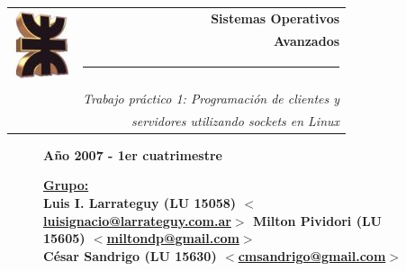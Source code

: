 \thispagestyle{empty}

\begin{center}
\begin{tabular}{cr}
\multirow{4}{*}{ \includegraphics{logoUTN.jpg} }
& \Huge\bfseries Sistemas Operativos \\
& \Huge\bfseries Avanzados \\
& \noindent\rule[-1ex]{120mm}{4pt} \\
& \\
& \noindent\large\emph{Trabajo práctico 1: Programación de clientes y} \\
& \noindent\large\emph{servidores utilizando sockets en Linux}
\end{tabular}
\end{center}


\begin{figure}[b]
\center\large\textbf{Año 2007 - 1er cuatrimestre}
\normalsize
\linebreak
\begin{flushleft}
\bfseries
\underline{Grupo:}\\
Luis I. Larrateguy (\textnormal{LU} 15058) \href{mailto:luisignacio@larrateguy.com.ar}
  {$<$luisignacio@larrateguy.com.ar$>$}
Milton Pividori (\textnormal{LU} 15605) \href{mailto:miltondp@gmail.com}
  {$<$miltondp@gmail.com$>$}\\
César Sandrigo (\textnormal{LU} 15630) \href{mailto:cmsandrigo@gmail.com}
  {$<$cmsandrigo@gmail.com$>$}
\end{flushleft}

\end{figure}

